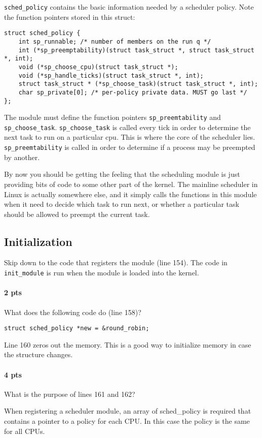 \documentclass[letterpaper,10pt]{article}
\begin{document}
\verb=sched_policy= contains the basic information needed by a scheduler policy. Note the
function pointers stored in this struct:
\begin{verbatim}
struct sched_policy {
    int sp_runnable; /* number of members on the run q */
    int (*sp_preemptability)(struct task_struct *, struct task_struct *, int);
    void (*sp_choose_cpu)(struct task_struct *);
    void (*sp_handle_ticks)(struct task_struct *, int);
    struct task_struct * (*sp_choose_task)(struct task_struct *, int);
    char sp_private[0]; /* per-policy private data. MUST go last */
};
\end{verbatim}
The module must define the function pointers \verb=sp_preemtability= and \verb=sp_choose_task=.
\verb=sp_choose_task= is called every tick in order to determine the next task to run on a particular
cpu. This is where the core of the scheduler lies.
\verb=sp_preemtability= is called in order to determine if a process may be preempted by
another.

By now you should be getting the feeling that the scheduling module is just providing bits
of code to some other part of the kernel. The mainline scheduler in Linux is actually
somewhere else, and it simply calls the functions in this module when it need to decide
which task to run next, or whether a particular task should be allowed to preempt the
current task.

\subsection{Initialization}

Skip down to the code that registers the module (line 154). The code in \verb=init_module= is
run when the module is loaded into the kernel.

\paragraph{2 pts} What does the following code do (line 158)?
\begin{verbatim}
struct sched_policy *new = &round_robin;
\end{verbatim}
Line 160 zeros out the memory. This is a good way to initialize memory in case the structure changes.
\paragraph{4 pts} What is the purpose of lines 161 and 162?

When registering a scheduler module, an array of sched\_policy is required that contains
a pointer to a policy for each CPU. In this case the policy is the same for all CPUs.
\end{document}
